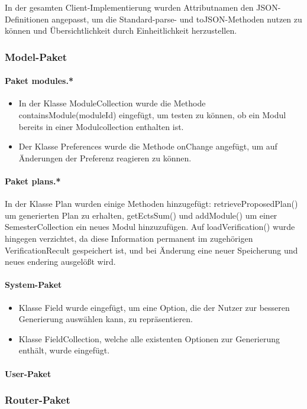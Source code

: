 In der gesamten Client-Implementierung wurden Attributnamen den JSON-Definitionen angepasst, um die Standard-parse- und toJSON-Methoden nutzen zu können und Übersichtlichkeit durch Einheitlichkeit herzustellen.
\subsubsection{Model-Paket}
\paragraph{Paket modules.*} 
\begin{itemize} [nosep]
\item In der Klasse ModuleCollection wurde die Methode containsModule(moduleId) eingefügt, um testen zu können, ob ein Modul bereits in einer Modulcollection enthalten ist. 
\item Der Klasse Preferences wurde die Methode onChange angefügt, um auf Änderungen der Preferenz reagieren zu können.
\end  {itemize}
\paragraph{Paket plans.*} In der Klasse Plan wurden einige Methoden hinzugefügt:  retrieveProposedPlan() um generierten Plan zu erhalten, getEctsSum() und  addModule() um einer SemesterCollection ein neues Modul hinzuzufügen. Auf loadVerification() wurde hingegen verzichtet, da diese Information permanent im zugehörigen VerificationRecult gespeichert ist, und bei Änderung eine neuer Speicherung und neues endering ausgelößt wird.

\paragraph{System-Paket}
\begin{itemize}
\item Klasse Field wurde eingefügt, um eine Option, die der Nutzer zur besseren Generierung auswählen kann, zu repräsentieren.
\item Klasse FieldCollection, welche alle existenten Optionen zur Generierung enthält, wurde eingefügt.
\end{itemize}

\paragraph{User-Paket}

\subsubsection{Router-Paket}

